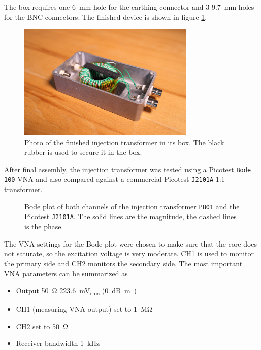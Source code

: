 \documentclass[12pt]{book}
\providecommand{\device}[1]{\texttt{\small #1}}
\begin{document}
The box requires one \qty{6}{\mm} hole for the earthing connector and 3 \qty{9.7}{\mm} holes for the BNC connectors. The finished device is shown in figure \ref{fig:injection_transformer_assembled}.

\begin{figure}[ht]
    \centering
    \includegraphics[width=0.75\textwidth]{../images/transformer_cropped_lowres.jpg}
    \caption{Photo of the finished injection transformer in its box. The black rubber is used to secure it in the box.}
    \label{fig:injection_transformer_assembled}
\end{figure}

After final assembly, the injection transformer was tested using a Picotest \device{Bode 100} VNA and also compared against a commercial Picotest \device{J2101A} 1:1 transformer.

\begin{figure}[hb!]
    \centering
    
    \caption{Bode plot of both channels of the injection transformer \device{PB01} and the Picotest \device{J2101A}. The solid lines are the magnitude, the dashed lines is the phase.}
    \label{fig:injection_transformer_bode}
\end{figure}

The VNA settings for the Bode plot were chosen to make sure that the core does not saturate, so the excitation voltage is very moderate. CH1 is used to monitor the primary side and CH2 monitors the secondary side. The most important VNA parameters can be summarized as

\begin{itemize}
    \itemsep0em
    \item Output \qty{50}{\ohm} \qty{223.6}{\mV_{rms}} (\qty{0}{\dB m)}
    \item CH1 (measuring VNA output) set to \qty{1}{\mega\ohm}
    \item CH2 set to \qty{50}{\ohm}
    \item Receiver bandwidth \qty{1}{\kHz}
\end{itemize}
\end{document}
